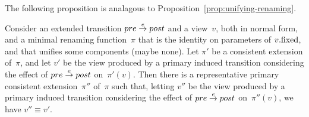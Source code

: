 
The following proposition is analagous to 
Proposition~\ref{prop:unifying-renaming}.
%
\begin{prop}
\label{prop:unifying-renaming-singleRef-primary}
Consider an extended transition $pre \stackrel{e}\rightarrow post$ and a view~$v$, both in
normal form, and  a minimal renaming function~$\pi$ that is the identity on
parameters of $v.\mathrm{fixed}$, and that unifies some components (maybe none).
%
Let $\pi'$ be a consistent extension of~$\pi$, and let $v'$ be the view
produced by a primary induced transition considering the effect of $pre
\stackrel{e}\rightarrow post$ on~$\pi'(v)$.
%
Then there is a representative primary consistent extension~$\pi''$ of~$\pi$
such that, letting $v''$ be the view produced by a primary induced transition
considering the effect of $pre \stackrel{e}\rightarrow post$ on~$\pi''(v)$, we have $v''
\equiv v'$.
\end{prop}


